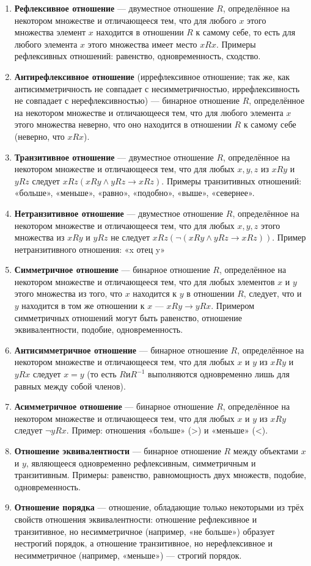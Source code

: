 \documentclass{article}
\begin{document}
\begin{enumerate}

    \item \textbf{Рефлексивное отношение} — двуместное отношение $R$, определённое на некотором множестве и отличающееся тем, что для любого $x$ этого множества элемент $x$ находится в отношении $R$ к самому себе, то есть для любого элемента $x$ этого множества имеет место $xRx$. Примеры рефлексивных отношений: равенство, одновременность, сходство.
    \item \textbf{Антирефлексивное отношение} (иррефлексивное отношение; так же, как антисимметричность не совпадает с несимметричностью, иррефлексивность не совпадает с нерефлексивностью) — бинарное отношение $R$, определённое на некотором множестве и отличающееся тем, что для любого элемента $x$ этого множества неверно, что оно находится в отношении $R$ к самому себе (неверно, что $xRx$).
    \item \textbf{Транзитивное отношение} — двуместное отношение $R$, определённое на некотором множестве и отличающееся тем, что для любых $x,y,z$ из $xRy$ и $yRz$ следует $x R z (xRy \wedge yRz\to xRz)$. Примеры транзитивных отношений: «больше», «меньше», «равно», «подобно», «выше», «севернее».
    \item \textbf{Нетранзитивное отношение} — двуместное отношение $R$, определённое на некотором множестве и отличающееся тем, что для любых $x,y,z$ этого множества из $xRy$ и $yRz$ не следует $xRz (\neg (xRy\wedge yRz\to xRz))$. Пример нетранзитивного отношения: «x отец y»
    \item \textbf{Симметричное отношение} — бинарное отношение $R$, определённое на некотором множестве и отличающееся тем, что для любых элементов $x$ и $y$ этого множества из того, что  $x$ находится к $y$ в отношении $R$, следует, что и $y$ находится в том же отношении к $x$ — $xRy\to yRx$. Примером симметричных отношений могут быть равенство, отношение эквивалентности, подобие, одновременность.
    \item \textbf{Антисимметричное отношение} — бинарное отношение $R$, определённое на некотором множестве и отличающееся тем, что для любых $x$ и $y$ из $xRy$ и $yRx$ следует $x=y$ (то есть $R и R^{{-1}}$ выполняются одновременно лишь для равных между собой членов).
    \item \textbf{Асимметричное отношение} — бинарное отношение $R$, определённое на некотором множестве и отличающееся тем, что для любых $x$ и $y$ из $xRy$ следует $\neg yRx$. Пример: отношения «больше» (>) и «меньше» (<).
    \item \textbf{Отношение эквивалентности} — бинарное отношение $R$ между объектами $x$ и $y$, являющееся одновременно рефлексивным, симметричным и транзитивным. Примеры: равенство, равномощность двух множеств, подобие, одновременность.
    \item \textbf{Отношение порядка} — отношение, обладающие только некоторыми из трёх свойств отношения эквивалентности: отношение рефлексивное и транзитивное, но несимметричное (например, «не больше») образует нестрогий порядок, а отношение транзитивное, но нерефлексивное и несимметричное (например, «меньше») — строгий порядок.
\end{enumerate}
\end{document}
